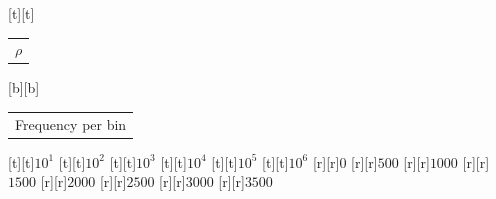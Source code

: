 %    
%
%
\begin{psfrags}%
\psfragscanon%
%
[t][t]{\color[rgb]{0,0,0}\setlength{\tabcolsep}{0pt}\begin{tabular}{c}{\Large$\rho$}\end{tabular}}%
[b][b]{\color[rgb]{0,0,0}\setlength{\tabcolsep}{0pt}\begin{tabular}{c}{\Large Frequency per bin}\end{tabular}}%
%
[t][t]{$10^1$}%
[t][t]{$10^2$}%
[t][t]{$10^3$}%
[t][t]{$10^4$}%
[t][t]{$10^5$}%
[t][t]{$10^6$}%
%
[r][r]{$0$}%
[r][r]{$500$}%
[r][r]{$1000$}%
[r][r]{$1500$}%
[r][r]{$2000$}%
[r][r]{$2500$}%
[r][r]{$3000$}%
[r][r]{$3500$}%
%
%
\end{psfrags}%
%
